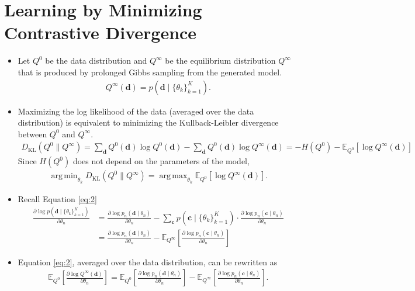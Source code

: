 \documentclass[10pt]{article}
\newcommand{\EE}{\mathbb{E}}
\newcommand{\KL}{D_{\text{KL}}}
\DeclareMathOperator*{\argmax}{arg\,max}
\DeclareMathOperator*{\argmin}{arg\,min}
\begin{document}
\newpage

\section{Learning by Minimizing Contrastive Divergence}

\begin{itemize}
\item Let $Q^0$ be the data distribution and $Q^\infty$ be the equilibrium distribution $Q^\infty$ that is produced by prolonged Gibbs sampling from the generated model.
\begin{align*}
Q^\infty(\mathbf{d}) = p(\mathbf{d} \mid \{\theta_k\}_{k = 1}^K).
\end{align*}
\item Maximizing the log likelihood of the data (averaged over the data distribution) is equivalent to minimizing the Kullback-Leibler divergence between $Q^0$ and $Q^\infty$.
\begin{align}
\KL(Q^0 \| Q^\infty) = \sum_\mathbf{d} Q^0(\mathbf{d}) \log Q^0(\mathbf{d}) - \sum_\mathbf{d} Q^0(\mathbf{d}) \log Q^\infty(\mathbf{d}) = -H(Q^0) - \EE_{Q^0}[\log Q^\infty(\mathbf{d})] \label{eq:3}
\end{align}
Since $H(Q^0)$ does not depend on the parameters of the model,
\begin{align*}
\argmin_{\theta_k} \KL(Q^0 \| Q^\infty) = \argmax_{\theta_k} \EE_{Q^0}[\log Q^\infty(\mathbf{d})].
\end{align*}
\item Recall Equation \eqref{eq:2}
\begin{align*}
\frac{\partial \log p(\mathbf{d} \mid \{\theta_k\}_{k = 1}^K)}{\partial \theta_n}  &= \frac{\partial \log p_n(\mathbf{d} \mid \theta_n)}{\partial \theta_n} - \sum_\mathbf{c} p(\mathbf{c} \mid \{\theta_k\}_{k = 1}^K) \cdot \frac{\partial \log p_n(\mathbf{c} \mid \theta_n)}{\partial \theta_n} \\
&= \frac{\partial \log p_n(\mathbf{d} \mid \theta_n)}{\partial \theta_n} - \EE_{Q^\infty} \left[ \frac{\partial \log p_n(\mathbf{c} \mid \theta_n)}{\partial \theta_n} \right]
\end{align*}
\item Equation \eqref{eq:2}, averaged over the data distribution, can be rewritten as
\begin{align}
\EE_{Q^0} \left[ \frac{\partial \log Q^\infty(\mathbf{d})}{\partial \theta_n} \right] = \EE_{Q^0} \left[ \frac{\partial \log p_n(\mathbf{d} \mid \theta_n)}{\partial \theta_n} \right] - \EE_{Q^\infty} \left[ \frac{\partial \log p_n(\mathbf{c} \mid \theta_n)}{\partial \theta_n} \right]. \label{eq:4}

\end{align}
\end{itemize}
\end{document}
